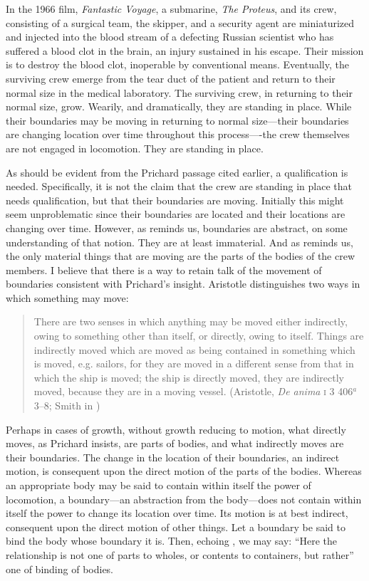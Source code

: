 In the 1966 film, \emph{Fantastic Voyage}, a submarine, \emph{The Proteus}, and its crew, consisting of a surgical team, the skipper, and a security agent are miniaturized and injected into the blood stream of a defecting Russian scientist who has suffered a blood clot in the brain, an injury sustained in his escape. Their mission is to destroy the blood clot, inoperable by conventional means. Eventually, the surviving crew emerge from the tear duct of the patient and return to their normal size in the medical laboratory. The surviving crew, in returning to their normal size, grow. Wearily, and dramatically, they are standing in place. While their boundaries may be moving in returning to normal size---their boundaries are changing location over time throughout this process----the crew themselves are not engaged in locomotion. They are standing in place.

As should be evident from the Prichard passage cited earlier, a qualification is needed. Specifically, it is not the claim that the crew are standing in place that needs qualification, but that their boundaries are moving. Initially this might seem unproblematic since their boundaries are located and their locations are changing over time. However, as \citet[103--4]{Derrida:2005aa} reminds us, boundaries are abstract, on some understanding of that notion. They are at least immaterial. And as \citet{Prichard:1950kx} reminds us, the only material things that are moving are the parts of the bodies of the crew members. I believe that there is a way to retain talk of the movement of boundaries consistent with Prichard's insight. Aristotle distinguishes two ways in which something may move: 
\begin{quote}
	There are two senses in which anything may be moved either indirectly, owing to something other than itself, or directly, owing to itself. Things are indirectly moved which are moved as being contained in something which is moved, e.g. sailors, for they are moved in a different sense from that in which the ship is moved; the ship is directly moved, they are indirectly moved, because they are in a moving vessel. (Aristotle, \emph{De anima} \textsc{i} 3 406\( ^{a} \)3--8; Smith in \citealt[9]{Barnes:1984uq})
\end{quote} 
Perhaps in cases of growth, without growth reducing to motion, what directly moves, as Prichard insists, are parts of bodies, and what indirectly moves are their boundaries. The change in the location of their boundaries, an indirect motion, is consequent upon the direct motion of the parts of the bodies. Whereas an appropriate body may be said to contain within itself the power of locomotion, a boundary---an abstraction from the body---does not contain within itself the power to change its location over time. Its motion is at best indirect, consequent upon the direct motion of other things. Let a boundary be said to bind the body whose boundary it is. Then, echoing \citet[174]{Witt:1995kx}, we may say: ``Here the relationship is not one of parts to wholes, or contents to containers, but rather'' one of binding of bodies.

